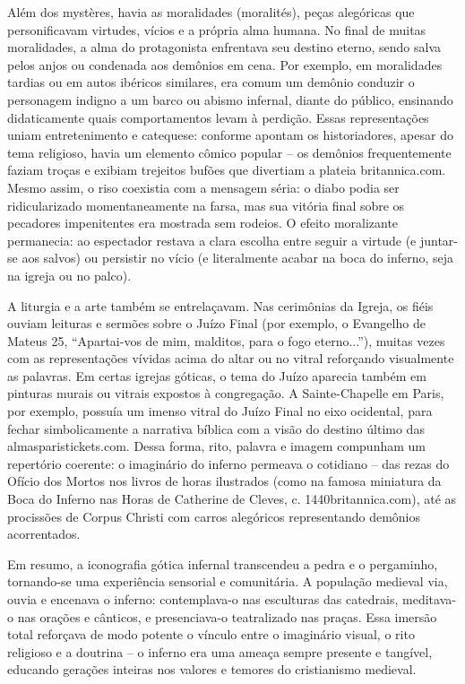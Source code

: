 Além dos mystères, havia as moralidades (moralités), peças alegóricas que personificavam virtudes, vícios e a própria alma humana. No final de muitas moralidades, a alma do protagonista enfrentava seu destino eterno, sendo salva pelos anjos ou condenada aos demônios em cena. Por exemplo, em moralidades tardias ou em autos ibéricos similares, era comum um demônio conduzir o personagem indigno a um barco ou abismo infernal, diante do público, ensinando didaticamente quais comportamentos levam à perdição. Essas representações uniam entretenimento e catequese: conforme apontam os historiadores, apesar do tema religioso, havia um elemento cômico popular -- os demônios frequentemente faziam troças e exibiam trejeitos bufões que divertiam a plateia britannica.com. Mesmo assim, o riso coexistia com a mensagem séria: o diabo podia ser ridicularizado momentaneamente na farsa, mas sua vitória final sobre os pecadores impenitentes era mostrada sem rodeios. O efeito moralizante permanecia: ao espectador restava a clara escolha entre seguir a virtude (e juntar-se aos salvos) ou persistir no vício (e literalmente acabar na boca do inferno, seja na igreja ou no palco).

A liturgia e a arte também se entrelaçavam. Nas cerimônias da Igreja, os fiéis ouviam leituras e sermões sobre o Juízo Final (por exemplo, o Evangelho de Mateus 25, “Apartai-vos de mim, malditos, para o fogo eterno...”), muitas vezes com as representações vívidas acima do altar ou no vitral reforçando visualmente as palavras. Em certas igrejas góticas, o tema do Juízo aparecia também em pinturas murais ou vitrais expostos à congregação. A Sainte-Chapelle em Paris, por exemplo, possuía um imenso vitral do Juízo Final no eixo ocidental, para fechar simbolicamente a narrativa bíblica com a visão do destino último das almasparistickets.com. Dessa forma, rito, palavra e imagem compunham um repertório coerente: o imaginário do inferno permeava o cotidiano -- das rezas do Ofício dos Mortos nos livros de horas ilustrados (como na famosa miniatura da Boca do Inferno nas Horas de Catherine de Cleves, c. 1440britannica.com), até as procissões de Corpus Christi com carros alegóricos representando demônios acorrentados.

Em resumo, a iconografia gótica infernal transcendeu a pedra e o pergaminho, tornando-se uma experiência sensorial e comunitária. A população medieval via, ouvia e encenava o inferno: contemplava-o nas esculturas das catedrais, meditava-o nas orações e cânticos, e presenciava-o teatralizado nas praças. Essa imersão total reforçava de modo potente o vínculo entre o imaginário visual, o rito religioso e a doutrina -- o inferno era uma ameaça sempre presente e tangível, educando gerações inteiras nos valores e temores do cristianismo medieval.

